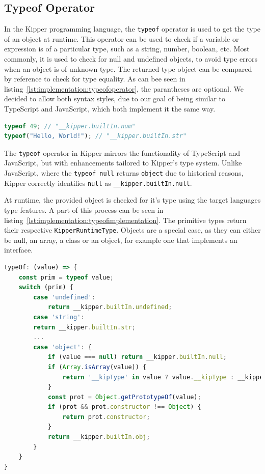 \subsection{Typeof Operator}
\label{subsec:typeof}

In the Kipper programming language, the \lstinline|typeof| operator is used to get the type of an object at runtime. This operator can be used to check if a variable or expression is of a particular type, such as a string, number, boolean, etc. Most commonly, it is used to check for null and undefined objects, to avoid type errors when an object is of unknown type. The returned type object can be compared by reference to check for type equality. As can bee seen in listing~\ref{lst:implementation:typeofoperator}, the parantheses are optional. We decided to allow both syntax styles, due to our goal of being similar to TypeScript and JavaScript, which both implement it the same way.

\begin{lstlisting}[language=Typescript,caption=Typeof operator used to determine the type of an input expression,label=lst:implementation:typeofoperator]
typeof 49; // "__kipper.builtIn.num"
typeof("Hello, World!"); // "__kipper.builtIn.str"
\end{lstlisting}

The  \lstinline|typeof| operator in Kipper mirrors the functionality of TypeScript and JavaScript, but with enhancements tailored to Kipper's type system. Unlike JavaScript, where the  \lstinline|typeof null| returns \lstinline|object| due to historical reasons, Kipper correctly identifies  \lstinline|null| as  \lstinline|__kipper.builtIn.null|.

At runtime, the provided object is checked for it's type using the target languages type features. A part of this process can be seen in listing~\ref{lst:implementation:typeofimplementation}. The primitive types return their respective \lstinline|KipperRuntimeType|. Objects are a special case, as they can either be null, an array, a class or an object, for example one that implements an interface.

\begin{lstlisting}[language=Typescript,caption=Logical implementation of the typeof operator in TypeScript, label=lst:implementation:typeofimplementation]
typeOf: (value) => {
    const prim = typeof value;
    switch (prim) {
        case 'undefined':
            return __kipper.builtIn.undefined;
        case 'string':
        return __kipper.builtIn.str;
        ...
        case 'object': {
            if (value === null) return __kipper.builtIn.null;
            if (Array.isArray(value)) {
                return '__kipType' in value ? value.__kipType : __kipper.builtIn.Array;
            }
            const prot = Object.getPrototypeOf(value);
            if (prot && prot.constructor !== Object) {
                return prot.constructor;
            }
            return __kipper.builtIn.obj;
        }
    }
}
\end{lstlisting}

